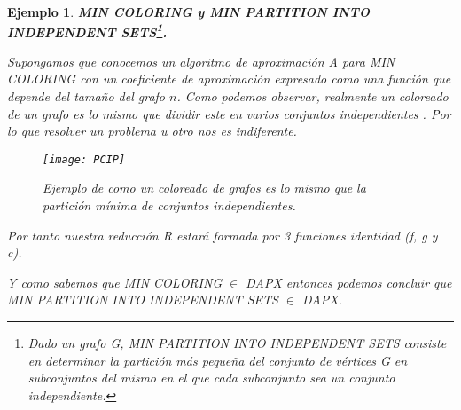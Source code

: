\documentclass[a4paper,12pt,titlepage]{article}
\newtheorem{eje}{Ejemplo}[section]
\begin{document}
\begin{eje}

\textbf{MIN COLORING y MIN PARTITION INTO INDEPENDENT SETS\footnote{Dado un grafo G, MIN PARTITION INTO INDEPENDENT SETS consiste en determinar la partici\'on m\'as pequeña del conjunto de v\'ertices G en subconjuntos del mismo en el que cada subconjunto sea un conjunto independiente.}.}

Supongamos que conocemos un algoritmo de aproximaci\'on A para MIN COLORING con un coeficiente de aproximaci\'on expresado como una funci\'on que depende del tamaño del grafo $n$. Como podemos observar, realmente un coloreado de un grafo es lo mismo que dividir este en varios conjuntos independientes \cite{approx_core}. Por lo que resolver un problema u otro nos es indiferente.

\begin{figure}[h]
\centering
\texttt{[image: PCIP]}
\caption{Ejemplo de como un coloreado de grafos es lo mismo que la partici\'on m\'inima de conjuntos independientes.}
\label{redux:fig:1}
\end{figure}

Por tanto nuestra reducci\'on R estará formada por 3 funciones identidad (f, g y c).

Y como sabemos que MIN COLORING $\in$ DAPX \cite{red1} entonces podemos concluir que MIN PARTITION INTO INDEPENDENT SETS $\in$ DAPX.

\end{eje}
\end{document}
